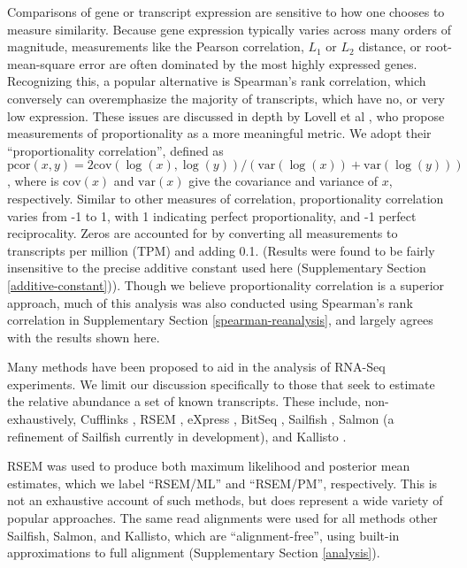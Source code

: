 \documentclass[twocolumn]{article}
\begin{document}
Comparisons of gene or transcript expression are sensitive to how one chooses to
measure similarity. Because gene expression typically varies across many orders
of magnitude, measurements like the Pearson correlation, $L_1$ or $L_2$
distance, or root-mean-square error are often dominated by the most highly
expressed genes. Recognizing this, a popular alternative is Spearman's rank
correlation, which conversely can overemphasize the majority of transcripts,
which have no, or very low expression. These issues are discussed in depth by
Lovell et al \cite{Lovell:2015il}, who propose measurements of proportionality
as a more meaningful metric. We adopt their ``proportionality correlation'',
defined as $\text{pcor}(x, y) = 2\text{cov}(\log(x), \log(y)) /
(\text{var}(\log(x)) + \text{var}(\log(y)))$, where is $\text{cov}(x)$ and
$\text{var}(x)$ give the covariance and variance of $x$, respectively. Similar
to other measures of correlation, proportionality correlation varies from -1 to
1, with 1 indicating perfect proportionality, and -1 perfect reciprocality.
Zeros are accounted for by converting all measurements to transcripts per
million (TPM) and adding 0.1. (Results were found to be fairly insensitive to the
precise additive constant used here (Supplementary Section
\ref{additive-constant})). Though we believe proportionality correlation is a
superior approach, much of this analysis was also conducted using Spearman's
rank correlation in Supplementary Section \ref{spearman-reanalysis}, and largely
agrees with the results shown here.

Many methods have been proposed to aid in the analysis of RNA-Seq
experiments. We limit our discussion specifically to those that seek to
estimate the relative abundance a set of known transcripts. These
include, non-exhaustively, Cufflinks \cite{Trapnell:2010kd},
RSEM \cite{Li:2011cb},
eXpress \cite{Roberts:2012dh},
BitSeq \cite{Glaus:2012ek},
Sailfish \cite{Patro:2014jd},
Salmon (a refinement of Sailfish currently in development), and
Kallisto \cite{Bray:2015uj}.

RSEM was used to produce both maximum likelihood and posterior mean estimates,
which we label ``RSEM/ML'' and ``RSEM/PM'', respectively. This is not an
exhaustive account of such methods, but does represent a wide variety of popular
approaches. The same read alignments were used for all methods other Sailfish,
Salmon, and Kallisto, which are ``alignment-free'', using built-in
approximations to full alignment (Supplementary Section \ref{analysis}).
\end{document}
